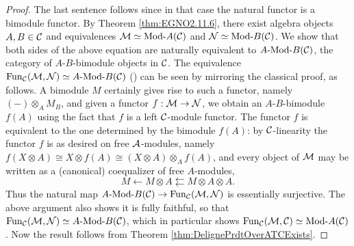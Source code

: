 \documentclass[a4paper]{amsart}
\begin{document}
\begin{proof}
	The last sentence follows since in that case the natural functor is a bimodule functor. By Theorem \ref{thm:EGNO2.11.6}, there exist algebra objects $A, B \in \mathcal C$ and equivalences $\cM \simeq \Mod{}{A}(\cC)$ and $\cN \simeq \Mod{}{B}(\cC)$. We show that both sides of the above equation are naturally equivalent to $\Mod{A}{B}(\cC)$, the category of $A$-$B$-bimodule objects in $\mathcal C$. The equivalence $\Fun_\cC(\cM, \cN) \simeq \Mod{A}{B}(\cC)$ (\cite[Prop 2.12.2]{EGNO}) can be seen by mirroring the classical proof, as follows. A bimodule $M$ certainly gives rise to such a functor, namely $(-) \otimes_{A} M_{B}$, 
	and given a functor $f: \mathcal M \rightarrow \mathcal N$, we obtain an $A$-$B$-bimodule $f(A)$ using the fact that $f$ is a left $\mathcal C$-module functor.  The functor $f$ is equivalent to the one determined by the bimodule $f(A)$: by $\mathcal C$-linearity the functor $f$ is as desired on free $\mathcal A$-modules, namely $f(X \otimes A) \cong X \otimes f(A)  \cong (X \otimes A) \otimes_A f(A)$, and every object of $\mathcal M$ may be written as a (canonical) coequalizer of free $A$-modules,
	\begin{equation*}
		M \leftarrow M \otimes A \leftleftarrows M \otimes A \otimes A.
	\end{equation*} 
Thus the natural map  $\Mod{A}{B}(\cC) \to \Fun_\cC(\cM, \cN)$ is essentially surjective. The above argument also shows it is fully faithful, so that $\Fun_\cC(\cM, \cN) \simeq \Mod{A}{B}(\cC)$, which in particular shows $\Fun_\cC(\cM, \cC) \simeq \Mod{}{A}(\cC)$. Now the result follows from Theorem \ref{thm:DelignePrdtOverATCExists}.
\end{proof} 
\end{document}
